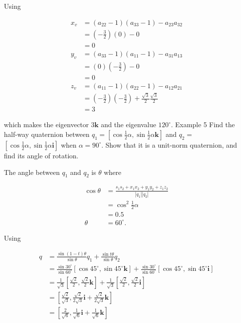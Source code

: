 Using

$$
\begin{aligned}
x_{v} & =\left(a_{22}-1\right)\left(a_{33}-1\right)-a_{23} a_{32} \\
& =\left(-\frac{3}{2}\right)(0)-0 \\
& =0 \\
y_{v} & =\left(a_{33}-1\right)\left(a_{11}-1\right)-a_{31} a_{13} \\
& =(0)\left(-\frac{3}{2}\right)-0 \\
& =0 \\
z_{v} & =\left(a_{11}-1\right)\left(a_{22}-1\right)-a_{12} a_{21} \\
& =\left(-\frac{3}{2}\right)\left(-\frac{3}{2}\right)+\frac{\sqrt{3}}{2} \frac{\sqrt{3}}{2} \\
& =3
\end{aligned}
$$

which makes the eigenvector $3 \mathbf{k}$ and the eigenvalue $120^{\circ}$. Example 5 Find the half-way quaternion between $q_{1}=\left[\cos \frac{1}{2} \alpha, \sin \frac{1}{2} \alpha \mathbf{k}\right]$ and $q_{2}=$ $\left[\cos \frac{1}{2} \alpha, \sin \frac{1}{2} \alpha \mathbf{i}\right]$ when $\alpha=90^{\circ}$. Show that it is a unit-norm quaternion, and find its angle of rotation.

The angle between $q_{1}$ and $q_{2}$ is $\theta$ where

$$
\begin{aligned}
\cos \theta & =\frac{s_{1} s_{2}+x_{1} x_{2}+y_{1} y_{2}+z_{1} z_{2}}{\left|q_{1}\right|\left|q_{2}\right|} \\
& =\cos ^{2} \frac{1}{2} \alpha \\
& =0.5 \\
\theta & =60^{\circ} .
\end{aligned}
$$

Using

$$
\begin{aligned}
q & =\frac{\sin (1-t) \theta}{\sin \theta} q_{1}+\frac{\sin t \theta}{\sin \theta} q_{2} \\
& =\frac{\sin 30^{\circ}}{\sin 60^{\circ}}\left[\cos 45^{\circ}, \sin 45^{\circ} \mathbf{k}\right]+\frac{\sin 30^{\circ}}{\sin 60^{\circ}}\left[\cos 45^{\circ}, \sin 45^{\circ} \mathbf{i}\right] \\
& =\frac{1}{\sqrt{3}}\left[\frac{\sqrt{2}}{2}, \frac{\sqrt{2}}{2} \mathbf{k}\right]+\frac{1}{\sqrt{3}}\left[\frac{\sqrt{2}}{2}, \frac{\sqrt{2}}{2} \mathbf{i}\right] \\
& =\left[\frac{\sqrt{2}}{\sqrt{3}}, \frac{\sqrt{2}}{2 \sqrt{3}} \mathbf{i}+\frac{\sqrt{2}}{2 \sqrt{3}} \mathbf{k}\right] \\
& =\left[\frac{2}{\sqrt{6}}, \frac{1}{\sqrt{6}} \mathbf{i}+\frac{1}{\sqrt{6}} \mathbf{k}\right]
\end{aligned}
$$

